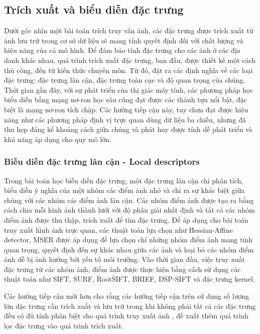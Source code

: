 \subsection{Trích xuất và biểu diễn đặc trưng}

Dưới góc nhìn một bài toán trích truy vấn ảnh, các đặc trưng được trích xuất từ ảnh lưu trữ trong cơ sở dữ liệu sẽ mang tính quyết định đối với chất lượng và hiệu năng của cả mô hình. Để đảm bảo tính đặc trưng cho các ảnh ở các địa danh khác nhau, quá trình trích xuất đặc trưng, ban đầu, được thiết kế một cách thủ công, đến từ kiến thức chuyên môn. Từ đó, đặt ra các định nghĩa về các loại đặc trưng: đặc trưng lân cận, đặc trưng toàn cục và độ quan trọng của chúng. Thời gian gần đây, với sự phát triển của thị giác máy tính, các phương pháp học biểu diễn bằng mạng nơ-ron học sâu cũng đạt được các thành tựu nổi bật, đặc biệt là mạng nơ-ron tích chập. Các hướng tiếp cận này, tuy chưa đạt được hiệu năng như các phương pháp định vị trực quan dùng dữ liệu ba chiều, nhưng đã thu hẹp đáng kể khoảng cách giữa chúng và phát huy được tính dễ phát triển và khả năng áp dụng cho quy mô lớn.

\subsubsection{Biễu diễn đặc trưng lân cận  - Local descriptors}

Trong bài toán học biễu diễn đặc trưng, một đặc trưng lân cận chỉ phân tích, biểu diễn ý nghĩa của một nhóm các điểm ảnh nhỏ và chỉ ra sự khác biệt giữa chúng với các nhóm các điểm ảnh lân cận\cite{CGV-017-localdescriptors}. Các nhóm điểm ảnh được tạo ra bằng cách chia mỗi hình ảnh thành lưới với độ phân giải nhất định và tất cả các nhóm điểm ảnh được thu thập, trích xuất để tìm đặc trưng. Để áp dụng cho bài toán truy xuất hình ảnh trực quan, các thuật toán lựa chọn như Hessian-Affine detector\cite{hessian-affine-detector}, MSER\cite{MSER-detector} được áp dụng để lựa chọn chỉ những nhóm điểm ảnh mang tính quan trọng, quyết định đến sự khác nhau giữa các ảnh và loại bỏ các nhóm điểm ảnh dễ bị ảnh hưởng bởi yếu tố môi trường. Vào thời gian đầu, việc truy xuất đặc trưng từ các nhóm ảnh, điểm ảnh được thực hiện bằng cách sử dụng các thuật toán như SIFT\cite{lowe1999object}, SURF\cite{bay2006surf}, RootSIFT\cite{Arandjelovi2012ThreeTE}, BRIEF\cite{brief}, DSP-SIFT\cite{Dong2014DomainsizePI} và đặc trưng kernel\cite{kernel-descriptors}.

Các hướng tiếp cận mới hơn cho rằng các hướng tiếp cận trên sử dụng số lượng lớn đặc trưng cần trích xuất và lưu trữ trong khi không phải tất cả các đặc trưng đều có đủ tính phân biệt cho quá trình truy xuất ảnh \cite{predicting-good-features}, đề xuất thêm quá trình lọc đặc trưng vào quá trình trích xuất.

